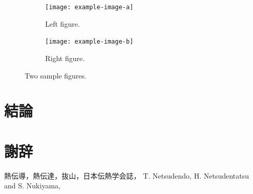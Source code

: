 \documentclass[
    paper=a4paper,      %
    article,            %
    fleqn,              %
    fontsize=10pt,      %
    jafontsize=10pt,    %
    head_space=20mm,    %
    foot_space=25mm,    %
    gutter=20mm,        %
    fore-edge=20mm      %
    ]{jlreq}            %
\begin{document}
\begin{figure}[tp]
  \centering
  \begin{subfigure}{0.45\columnwidth}
      \centering
      \texttt{[image: example-image-a]}
      \caption{Left figure.}
      \label{fig:two_figures_a}
  \end{subfigure}
  \hfill %
  \begin{subfigure}{0.45\columnwidth}
      \centering
      \texttt{[image: example-image-b]}
      \caption{Right figure.}
      \label{fig:two_figures_b}
  \end{subfigure}
  \caption{Two sample figures.}
  \label{fig:two_figures}
\end{figure}

\lipsum[1-4]

\section{結論}


\section*{謝辞}

\lipsum[1-2]

\begin{thebibliography}{99}
   熱伝導，熱伝達，抜山，日本伝熱学会誌，
   T. Netsudendo, H. Netsudentatsu and S. Nukiyama, 
\end{thebibliography}
\end{document}
